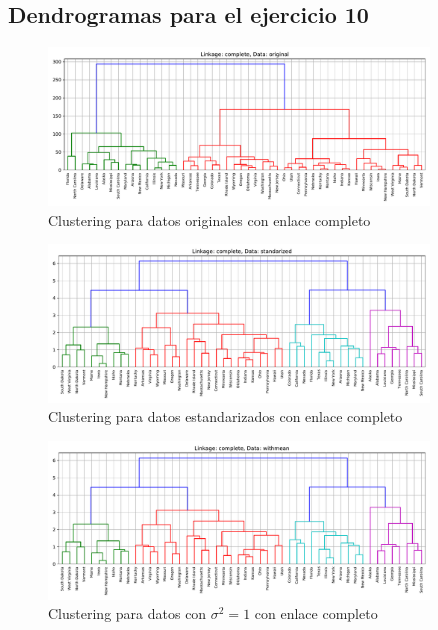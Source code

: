\documentclass[11pt]{article}
\begin{document}
\subsection*{Dendrogramas para el ejercicio 10}
\begin{figure}[H]
    \centering
    \includegraphics[width = 0.90\textwidth]{2-completeoriginal.pdf}
    \caption{Clustering para datos originales con enlace completo}
    \label{2-completeoriginal}
\end{figure}
\begin{figure}[H]
    \centering
    \includegraphics[width = 0.90\textwidth]{2-completestandarized.pdf}
    \caption{Clustering para datos estandarizados con enlace completo}
    \label{2-completestandarized}
\end{figure}
\begin{figure}[H]
    \centering
    \includegraphics[width = 0.90\textwidth]{2-completewithmean.pdf}
    \caption{Clustering para datos con $\sigma^2 = 1$ con enlace completo}
    \label{2-completewithmean}
\end{figure}
\end{document}
